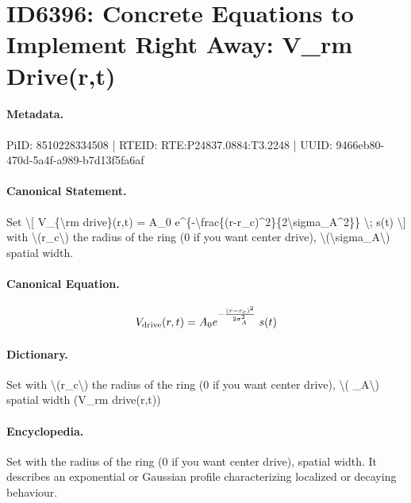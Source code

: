 \section*{ID6396: Concrete Equations to Implement Right Away: V\_rm Drive(r,t)}
\paragraph{Metadata.}
PiID: 8510228334508 | RTEID: RTE:P24837.0884:T3.2248 | UUID: 9466eb80-470d-5a4f-a989-b7d13f5fa6af

\paragraph{Canonical Statement.}
Set \textbackslash{}[ V\_\{\textbackslash{}rm drive\}(r,t) = A\_0 e\textasciicircum{}\{-\textbackslash{}frac\{(r-r\_c)\textasciicircum{}2\}\{2\textbackslash{}sigma\_A\textasciicircum{}2\}\} \textbackslash{}; s(t) \textbackslash{}] with \textbackslash{}(r\_c\textbackslash{}) the radius of the ring (0 if you want center drive), \textbackslash{}(\textbackslash{}sigma\_A\textbackslash{}) spatial width.

\paragraph{Canonical Equation.}
\[
V_{\rm drive}(r,t) = A_0 e^{-\frac{(r-r_c)^2}{2\sigma_A^2}} \; s(t)
\]

\paragraph{Dictionary.}
Set with \textbackslash{}(r\_c\textbackslash{}) the radius of the ring (0 if you want center drive), \textbackslash{}( \_A\textbackslash{}) spatial width (V\_rm drive(r,t))

\paragraph{Encyclopedia.}
Set with the radius of the ring (0 if you want center drive), spatial width. It describes an exponential or Gaussian profile characterizing localized or decaying behaviour.

